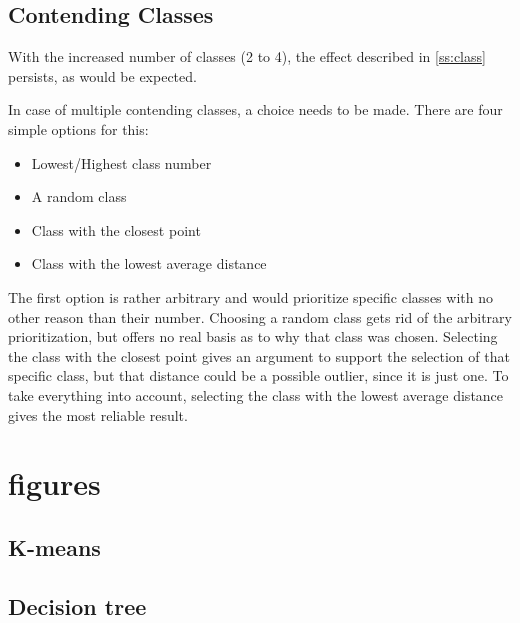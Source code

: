 \documentclass[10pt,a4paper]{article}
\begin{document}
\subsection{Contending Classes}
With the increased number of classes (2 to 4), the effect described in \ref{ss:class} persists, as would be expected.

In case of multiple contending classes, a choice needs to be made. There are four simple options for this:
\begin{itemize}
\item Lowest/Highest class number
\item A random class
\item Class with the closest point
\item Class with the lowest average distance
\end{itemize}

The first option is rather arbitrary and would prioritize specific classes with no other reason than their number. Choosing a random class gets rid of the arbitrary prioritization, but offers no real basis as to why that class was chosen.
Selecting the class with the closest point gives an argument to support the selection of that specific class, but that distance could be a possible outlier, since it is just one. To take everything into account, selecting the class with the lowest average distance gives the most reliable result.

\appendix
\section{figures}
\subsection{K-means}
\subsection{Decision tree}
\end{document}
